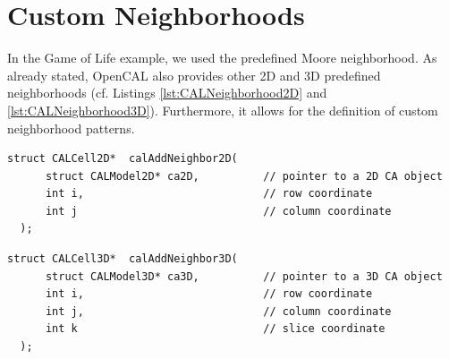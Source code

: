 

\section{Custom Neighborhoods}\label{sec:CustomNeiughbourhoods}
In the Game of Life example, we used the predefined Moore
neighborhood. As already stated, OpenCAL also provides other 2D and 3D
predefined neighborhoods (cf. Listings \ref{lst:CALNeighborhood2D} and
\ref{lst:CALNeighborhood3D}). Furthermore, it allows for the
definition of custom neighborhood patterns.





\begin{lstlisting}[float, label=lst:calAddNeighbor2D(), caption=The calAddNeighbor2D() functions to define custom neighborhood patterns in 2D CA., numbers=none]
  struct CALCell2D*  calAddNeighbor2D(
      struct CALModel2D* ca2D,          // pointer to a 2D CA object
      int i,                            // row coordinate
      int j                             // column coordinate
  );
\end{lstlisting}

\begin{lstlisting}[float, label=lst:calAddNeighbor3D(), caption=The calAddNeighbor3D() function to define custom neighborhood patterns in 3D CA., numbers=none]
  struct CALCell3D*  calAddNeighbor3D(
      struct CALModel3D* ca3D,          // pointer to a 3D CA object
      int i,                            // row coordinate
      int j,                            // column coordinate
      int k                             // slice coordinate
  );
\end{lstlisting}


